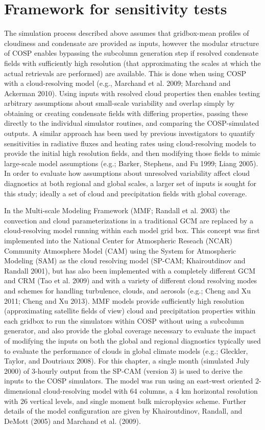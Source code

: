 \section{Framework for sensitivity
tests}\label{sec:subgridux5fframework}

The simulation process described above assumes that gridbox-mean
profiles of cloudiness and condensate are provided as inputs, however
the modular structure of COSP enables bypassing the subcolumn generation
step if resolved condensate fields with sufficiently high resolution
(that approximating the scales at which the actual retrievals are
performed) are available. This is done when using COSP with a
cloud-resolving model (e.g., Marchand et al. 2009; Marchand and Ackerman
2010). Using inputs with resolved cloud properties then enables testing
arbitrary assumptions about small-scale variability and overlap simply
by obtaining or creating condensate fields with differing properties,
passing these directly to the individual simulator routines, and
comparing the COSP-simulated outputs. A similar approach has been used
by previous investigators to quantify sensitivities in radiative fluxes
and heating rates using cloud-resolving models to provide the initial
high resolution fields, and then modifying those fields to mimic
large-scale model assumptions (e.g.; Barker, Stephens, and Fu 1999;
Liang 2005). In order to evaluate how assumptions about unresolved
variability affect cloud diagnostics at both regional and global scales,
a larger set of inputs is sought for this study; ideally a set of cloud
and precipitation fields with global coverage.

In the Multi-scale Modeling Framework (MMF; Randall et al. 2003) the
convection and cloud parameterizations in a traditional GCM are replaced
by a cloud-resolving model running within each model grid box. This
concept was first implemented into the National Center for Atmospheric
Reseach (NCAR) Community Atmosphere Model (CAM) using the System for
Atmospheric Modeling (SAM) as the cloud resolving model (SP-CAM;
Khairoutdinov and Randall 2001), but has also been implemented with a
completely different GCM and CRM (Tao et al. 2009) and with a variety of
different cloud resolving modes and schemes for handling turbulence,
clouds, and aerosols (e.g.; Cheng and Xu 2011; Cheng and Xu 2013). MMF
models provide sufficiently high resolution (approximating satellite
fields of view) cloud and precipitation properties within each gridbox
to run the simulators within COSP without using a subcolumn generator,
and also provide the global coverage necessary to evaluate the impact of
modifying the inputs on both the global and regional diagnostics
typically used to evaluate the performance of clouds in global climate
models (e.g.; Gleckler, Taylor, and Doutriaux 2008). For this chapter, a
single month (simulated July 2000) of 3-hourly output from the SP-CAM
(version 3) is used to derive the inputs to the COSP simulators. The
model was run using an east-west oriented 2-dimensional cloud-resolving
model with 64 columns, a 4 km horizontal resolution with 26 vertical
levels, and single moment bulk microphysics scheme. Further details of
the model configuration are given by Khairoutdinov, Randall, and DeMott
(2005) and Marchand et al. (2009).

